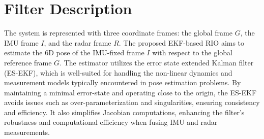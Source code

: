 \section{Filter Description}
\label{sec: filter description}
The system is represented with three coordinate frames: the global frame $G$, the IMU frame $I$, and the radar frame $R$. The proposed EKF-based RIO aims to estimate the 6D pose of the IMU-fixed frame $I$ with respect to the global reference frame $G$. The estimator utilizes the error state extended Kalman filter (ES-EKF), which is well-suited for handling the non-linear dynamics and measurement models typically encountered in pose estimation problems. By maintaining a minimal error-state and operating close to the origin, the ES-EKF avoids issues such as over-parameterization and singularities, ensuring consistency and efficiency. It also simplifies Jacobian computations, enhancing the filter’s robustness and computational efficiency when fusing IMU and radar measurements.





